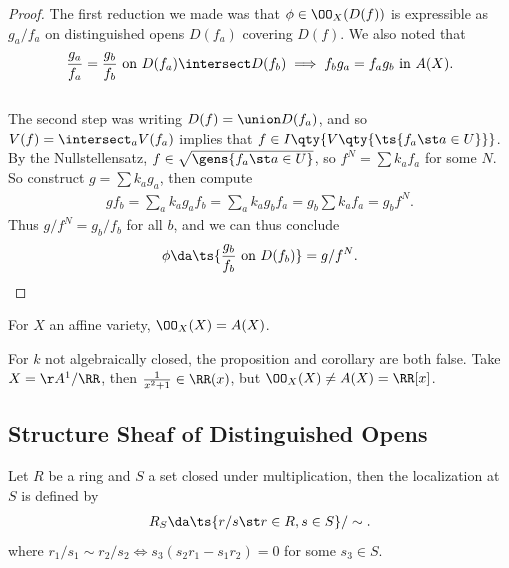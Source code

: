 \begin{proof}

The first reduction we made was that \(\phi \in \OO_X(D(f))\) is
expressible as \(g_a / f_a\) on distinguished opens \(D(f_a)\) covering
\(D(f)\). We also noted that
\begin{align*}
{g_a \over f_a} = {g_b \over f_b} \text{ on } D(f_a) \intersect D(f_b) \implies f_b g_a = f_a g_b \text{ in } A(X)
.\end{align*}\\

The second step was writing \(D(f) = \union D(f_a)\), and so
\(V(f) = \intersect_a V(f_a)\) implies that
\(f\in I\qty{ V\qty{ \ts{f_a \st a\in U} }}\). By the Nullstellensatz,
\(f\in \sqrt{\gens{f_a \st a\in U}}\), so \(f^N = \sum k_a f_a\) for
some \(N\). So construct \(g = \sum k_a g_a\), then compute
\begin{align*}  
gf_b = \sum_a k_a g_a f_b = \sum_a k_a g_b f_a = g_b \sum k_a f_a = g_b f^N
.\end{align*} Thus \(g/f^N = g_b / f_b\) for all \(b\), and we can thus
conclude
\begin{align*}  
\phi \da \ts{{g_b \over f_b} \text{ on } D(f_b)} = g/f^N
.\end{align*}

\end{proof}

\begin{corollary}[?]

For \(X\) an affine variety, \(\OO_X(X) = A(X)\).

\end{corollary}

\begin{warnings}

For \(k\) not algebraically closed, the proposition and corollary are
both false. Take \(X = \AA^1/\RR\), then \({1\over x^2+1} \in \RR(x)\),
but \(\OO_X(X) \neq A(X) = \RR[x]\).

\end{warnings}

\hypertarget{structure-sheaf-of-distinguished-opens}{%
\subsection{Structure Sheaf of Distinguished
Opens}\label{structure-sheaf-of-distinguished-opens}}

\begin{definition}[Localization]

Let \(R\) be a ring and \(S\) a set closed under multiplication, then
the localization at \(S\) is defined by
\begin{align*}  
R_S \da \ts{r/s \st r\in R, s\in S} / \sim
.\end{align*} where
\(r_1/s_1 \sim r_2/s_2 \iff s_3(s_2 r_1 - s_1 r_2) = 0\) for some
\(s_3 \in S\).

\end{definition}

